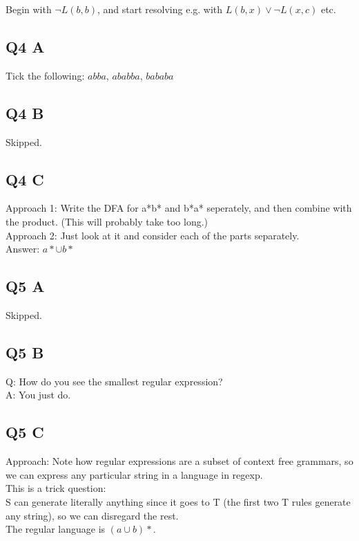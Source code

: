\documentclass[12pt]{article}
\begin{document}
Begin with $\neg L(b,b)$, and start resolving e.g. with $L(b,x) \lor \neg L(x,c) $ etc.

\subsection*{Q4 A}

Tick the following:
$abba$, $ababba$, $bababa$

\subsection*{Q4 B}

Skipped.

\subsection*{Q4 C}

Approach 1:
Write the DFA for a*b* and b*a* seperately, and then combine with the product. (This will probably take too long.) \\
Approach 2: 
Just look at it and consider each of the parts separately.\\

Answer: $a* \cup b*$

\subsection*{Q5 A}

Skipped.

\subsection*{Q5 B}
Q: How do you see the smallest regular expression? \\
A: You just do. \\

\subsection*{Q5 C}

Approach: Note how regular expressions are a subset of context free grammars, so we can express any particular string in a language in regexp.\\
This is a trick question:\\
S can generate literally anything since it goes to T (the first two T rules generate any string), so we can disregard the rest. \\
The regular language is $(a \cup b)*$. \\
\end{document}
